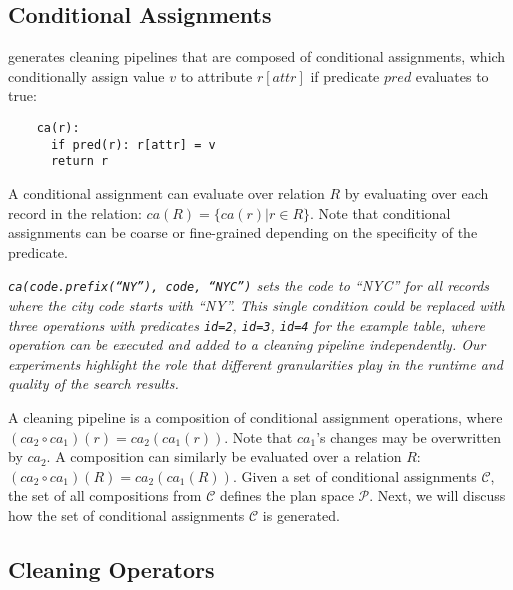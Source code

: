 \subsection{Conditional Assignments}
\sys generates cleaning pipelines that are composed of conditional assignments, which conditionally assign value $v$ to attribute $r[attr]$ if predicate $pred$ evaluates to true:
{\small\begin{verbatim}
    ca(r):
      if pred(r): r[attr] = v 
      return r
\end{verbatim}
}
\noindent A conditional assignment can evaluate over relation $R$ by evaluating over each record in the relation:  $ca(R) = \{ca(r) | r \in R\}$.   Note that conditional assignments can be coarse or fine-grained depending on the specificity of the predicate.  

\begin{example}\it
  \texttt{ca(code.prefix(``NY''), code, ``NYC'')} sets the code to ``NYC'' for all records where the city code starts with ``NY''.  This single condition could be replaced with three operations with predicates  \texttt{id=2}, \texttt{id=3}, \texttt{id=4} {\it for the example table}, where operation can be executed and added to a cleaning pipeline independently. Our experiments highlight the role that different granularities play in the runtime and quality of the search results.
 \end{example}


A cleaning pipeline is a composition of conditional assignment operations, where $(ca_2 \circ ca_1)(r) = ca_2(ca_1(r))$. Note that $ca_1$'s changes may be overwritten by $ca_2$.  A composition can similarly be evaluated over a relation $R$: $(ca_2\circ ca_1)(R) = ca_2(ca_1(R))$.    Given a set of conditional assignments $\mathcal{C}$, the set of all compositions from $\mathcal{C}$ defines the plan space $\mathcal{P}$.   Next, we will discuss how the set of conditional assignments $\mathcal{C}$ is generated.


\subsection{Cleaning Operators}

